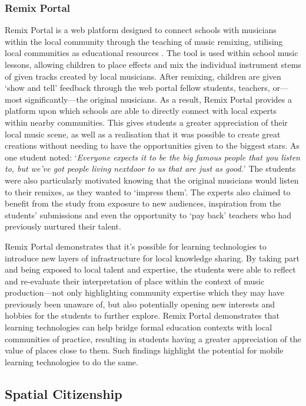 \subsubsection{Remix Portal}

Remix Portal is a web platform designed to connect schools with musicians within the local community through the teaching of music remixing, utilising local communities as educational resources \citep{Dodds2017}. The tool is used within school music lessons, allowing children to place effects and mix the individual instrument stems of given tracks created by local musicians. After remixing, children are given `show and tell' feedback through the web portal fellow students, teachers, or---most significantly---the original musicians. As a result, Remix Portal provides a platform upon which schools are able to directly connect with local experts within nearby communities. This gives students a greater appreciation of their local music scene, as well as a realisation that it was possible to create great creations without needing to have the opportunities given to the biggest stars. As one student noted: `\textit{Everyone expects it to be the big famous people that you listen to, but we've got people living nextdoor to us that are just as good.}' The students were also particularly motivated knowing that the original musicians would listen to their remixes, as they wanted to `impress them'. The experts also claimed to benefit from the study from exposure to new audiences, inspiration from the students' submissions and even the opportunity to `pay back' teachers who had previously nurtured their talent.

Remix Portal demonstrates that it's possible for learning technologies to introduce new layers of infrastructure for local knowledge sharing. By taking part and being exposed to local talent and expertise, the students were able to reflect and re-evaluate their interpretation of place within the context of music production---not only highlighting community expertise which they may have previously been unaware of, but also potentially opening new interests and hobbies for the students to further explore. Remix Portal demonstrates that learning technologies can help bridge formal education contexts with local communities of practice, resulting in students having a greater appreciation of the value of places close to them. Such findings highlight the potential for mobile learning technologies to do the same.

\subsection{Spatial Citizenship}

